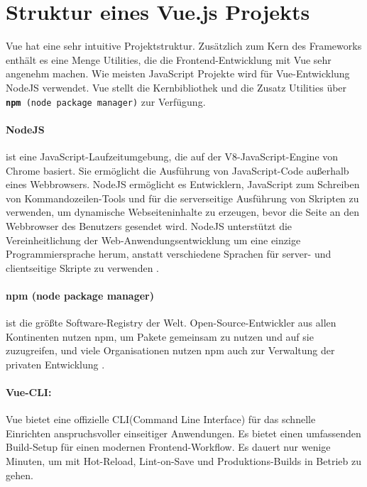 \section{Struktur eines Vue.js Projekts}
\label{sec:Struktur eines Vue.js Projekts}
Vue hat eine sehr intuitive Projektstruktur. Zusätzlich zum Kern des Frameworks enthält es eine Menge Utilities, die die Frontend-Entwicklung mit Vue sehr angenehm machen.
Wie meisten JavaScript Projekte wird für Vue-Entwicklung NodeJS verwendet. Vue stellt die Kernbibliothek und die Zusatz Utilities über \texttt{\textbf{\gls{npm}} (node package manager)} zur Verfügung.

\paragraph{NodeJS} ist eine JavaScript-Laufzeitumgebung, die auf der V8-JavaScript-Engine von Chrome basiert. Sie ermöglicht die Ausführung von JavaScript-Code außerhalb eines Webbrowsers. NodeJS ermöglicht es Entwicklern, JavaScript zum Schreiben von Kommandozeilen-Tools und für die serverseitige Ausführung von Skripten zu verwenden, um dynamische Webseiteninhalte zu erzeugen, bevor die Seite an den Webbrowser des Benutzers gesendet wird. NodeJS unterstützt die Vereinheitlichung der Web-Anwendungsentwicklung um eine einzige Programmiersprache herum, anstatt verschiedene Sprachen für server- und clientseitige Skripte zu verwenden \cite{NodeJS:Online}.

\paragraph{npm (node package manager)} ist die größte Software-Registry der Welt. Open-Source-Entwickler aus allen Kontinenten nutzen npm, um Pakete gemeinsam zu nutzen und auf sie zuzugreifen, und viele Organisationen nutzen npm auch zur Verwaltung der privaten Entwicklung \cite{NPM:Online}.

\paragraph*{Vue-CLI:} Vue bietet eine offizielle CLI(Command Line Interface) für das schnelle Einrichten anspruchsvoller einseitiger Anwendungen. Es bietet einen umfassenden Build-Setup für einen modernen Frontend-Workflow. Es dauert nur wenige Minuten, um mit Hot-Reload, Lint-on-Save und Produktions-Builds in Betrieb zu gehen.

